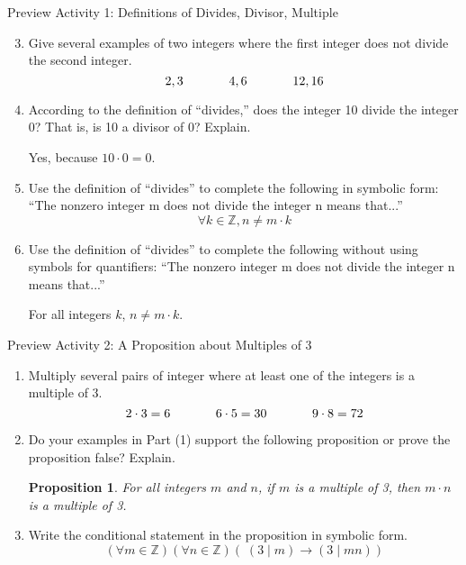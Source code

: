 \documentclass{beamer}
\newtheorem{prop}[theorem]{Proposition}
\begin{document}
\begin{frame}{Preview Activity 1: Definitions of Divides, Divisor, Multiple}
	\begin{enumerate}
		\setcounter{enumi}{2}
		\item Give several examples of two integers where the first integer does not divide the second integer. \pause
		\[
		2,3 \hspace{.5 in} 4,6 \hspace{.5 in} 12,16
		\]
		\pause \vspace{-.3 in}
		\item According to the definition of ``divides,'' does the integer 10 divide the integer 0?  That is, is 10 a divisor of 0?  Explain. \pause
		\begin{center}
			Yes, because $10 \cdot 0 = 0$. \pause
		\end{center}
		\item Use the definition of ``divides'' to complete the following in symbolic form: ``The nonzero integer m does not divide the integer n means that...'' \pause
		\[
			\forall k \in \mathbb{Z}, n \neq m \cdot k
		\]
		\pause \vspace{-.3 in}
		\item Use the definition of ``divides'' to complete the following without using symbols for quantifiers: ``The nonzero integer m does not divide the integer n means that...'' \pause
		\begin{center}
			For all integers $k$, $n \neq m \cdot k$.
		\end{center}
	\end{enumerate}
\end{frame}

\begin{frame}{Preview Activity 2: A Proposition about Multiples of 3}
	\begin{enumerate}
		\item Multiply several pairs of integer where at least one of the integers is a multiple of 3.\pause
		\[2 \cdot 3 = 6 \hspace{.5 in} 6 \cdot 5 = 30 \hspace{.5 in} 9 \cdot 8 = 72\]
		\pause \vspace{-.3 in}
		\item Do your examples in Part (1) support the following proposition or prove the proposition false?  Explain.
		\begin{prop}
			For all integers $m$ and $n$, if $m$ is a multiple of 3, then $m \cdot n$ is a multiple of 3. \pause
		\end{prop}
		\item Write the conditional statement in the proposition in symbolic form. \pause
		\[
		(\forall m \in \mathbb{Z})(\forall n \in \mathbb{Z})(\;(3 \; | \; m) \to (3 \; | \; mn))
		\]
	\end{enumerate}
\end{frame}
\end{document}
